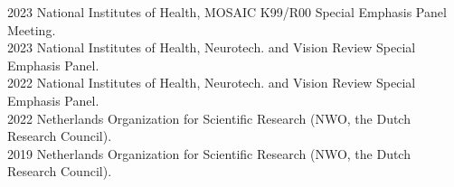 2023 \hspace{58pt} National Institutes of Health, MOSAIC K99/R00 Special Emphasis Panel Meeting. \\
2023 \hspace{58pt} National Institutes of Health, Neurotech. and Vision Review Special Emphasis Panel. \\
2022 \hspace{58pt} National Institutes of Health, Neurotech. and Vision Review Special Emphasis Panel. \\
2022 \hspace{58pt} Netherlands Organization for Scientific Research (NWO, the Dutch Research Council). \\
2019 \hspace{58pt} Netherlands Organization for Scientific Research (NWO, the Dutch Research Council). \\
\\